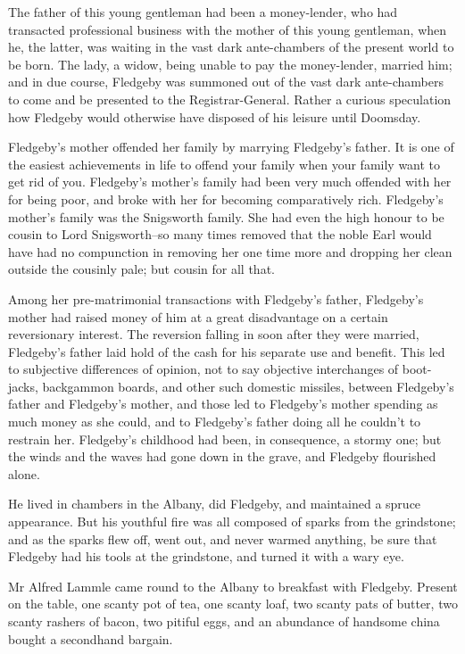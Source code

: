 The father of this young gentleman had been a money-lender, who
had transacted professional business with the mother of this
young gentleman, when he, the latter, was waiting in the vast dark
ante-chambers of the present world to be born. The lady, a widow, being
unable to pay the money-lender, married him; and in due course, Fledgeby
was summoned out of the vast dark ante-chambers to come and be presented
to the Registrar-General. Rather a curious speculation how Fledgeby
would otherwise have disposed of his leisure until Doomsday.

Fledgeby’s mother offended her family by marrying Fledgeby’s father. It
is one of the easiest achievements in life to offend your family when
your family want to get rid of you. Fledgeby’s mother’s family had
been very much offended with her for being poor, and broke with her
for becoming comparatively rich. Fledgeby’s mother’s family was the
Snigsworth family. She had even the high honour to be cousin to Lord
Snigsworth--so many times removed that the noble Earl would have had no
compunction in removing her one time more and dropping her clean outside
the cousinly pale; but cousin for all that.

Among her pre-matrimonial transactions with Fledgeby’s father,
Fledgeby’s mother had raised money of him at a great disadvantage on a
certain reversionary interest. The reversion falling in soon after they
were married, Fledgeby’s father laid hold of the cash for his separate
use and benefit. This led to subjective differences of opinion, not to
say objective interchanges of boot-jacks, backgammon boards, and other
such domestic missiles, between Fledgeby’s father and Fledgeby’s mother,
and those led to Fledgeby’s mother spending as much money as she
could, and to Fledgeby’s father doing all he couldn’t to restrain her.
Fledgeby’s childhood had been, in consequence, a stormy one; but the
winds and the waves had gone down in the grave, and Fledgeby flourished
alone.

He lived in chambers in the Albany, did Fledgeby, and maintained a
spruce appearance. But his youthful fire was all composed of sparks from
the grindstone; and as the sparks flew off, went out, and never warmed
anything, be sure that Fledgeby had his tools at the grindstone, and
turned it with a wary eye.

Mr Alfred Lammle came round to the Albany to breakfast with Fledgeby.
Present on the table, one scanty pot of tea, one scanty loaf, two scanty
pats of butter, two scanty rashers of bacon, two pitiful eggs, and an
abundance of handsome china bought a secondhand bargain.

